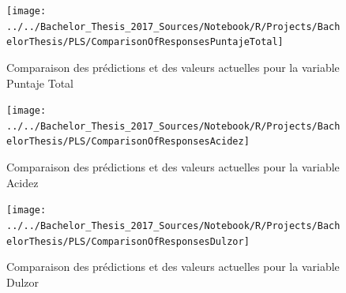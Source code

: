 \begin{figure}[H]
	\centering
	\texttt{[image: ../../Bachelor\_Thesis\_2017\_Sources/Notebook/R/Projects/BachelorThesis/PLS/ComparisonOfResponsesPuntajeTotal]}
	\caption{Comparaison des prédictions et des valeurs actuelles pour la variable Puntaje Total}
	\label{fig:comparisonofresponsespuntajetotal}
\end{figure}


\begin{figure}[H]
	\centering
	\texttt{[image: ../../Bachelor\_Thesis\_2017\_Sources/Notebook/R/Projects/BachelorThesis/PLS/ComparisonOfResponsesAcidez]}
	\caption{Comparaison des prédictions et des valeurs actuelles pour la variable Acidez}
	\label{fig:comparisonofresponsesacidez}
\end{figure}



\begin{figure}[H]
	\centering
	\texttt{[image: ../../Bachelor\_Thesis\_2017\_Sources/Notebook/R/Projects/BachelorThesis/PLS/ComparisonOfResponsesDulzor]}
	\caption{Comparaison des prédictions et des valeurs actuelles pour la variable Dulzor}
	\label{fig:comparisonofresponsesdulzor}
\end{figure}



















